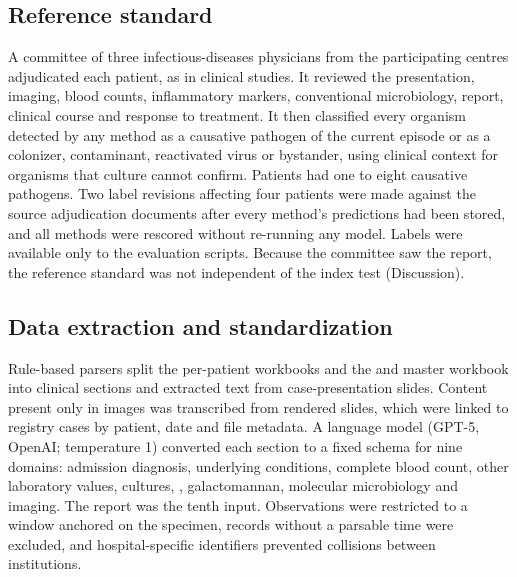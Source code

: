 \subsection*{Reference standard}
A committee of three infectious-diseases physicians from the participating centres adjudicated each patient, as in clinical \mngs studies\cite{wilson2019clinical,miller2019laboratory}. It reviewed the presentation, imaging, blood counts, inflammatory markers, conventional microbiology, \mngs report, clinical course and response to treatment. It then classified every organism detected by any method as a causative pathogen of the current episode or as a colonizer, contaminant, reactivated virus or bystander, using clinical context for organisms that culture cannot confirm. Patients had one to eight causative pathogens.  Two label revisions affecting four patients were made against the source adjudication documents after every method's predictions had been stored, and all methods were rescored without re-running any model.  Labels were available only to the evaluation scripts. Because the committee saw the \mngs report, the reference standard was not independent of the index test (Discussion).

\subsection*{Data extraction and standardization}
Rule-based parsers split the \kmuh per-patient workbooks and the \tvgh and \tsgh master workbook into clinical sections and extracted text from case-presentation slides. Content present only in images was transcribed from rendered slides, which were linked to registry cases by patient, date and file metadata. A language model (GPT-5, OpenAI; temperature 1) converted each section to a fixed schema for nine domains: admission diagnosis, underlying conditions, complete blood count, other laboratory values, cultures, \filmarray, galactomannan, molecular microbiology and imaging. The \mngs report was the tenth input. Observations were restricted to a window anchored on the \mngs specimen, records without a parsable time were excluded, and hospital-specific identifiers prevented collisions between institutions.

